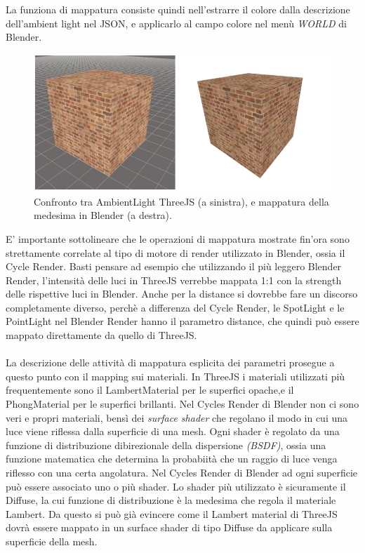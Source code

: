La funziona di mappatura consiste quindi nell’estrarre il colore dalla descrizione dell’ambient light nel JSON, e applicarlo al campo colore nel menù \emph{WORLD} di Blender.
\\
\begin{figure}[htb]
 \centering
 \includegraphics[width=1\linewidth]{images/chapter_baking_service/ba_se_confronto_cubi.png}\hfill
 \caption[Mappatura AmbientLight]{Confronto tra AmbientLight ThreeJS (a sinistra), e mappatura della medesima in Blender (a destra).}
 \label{fig:ba_se_confronto_cubi}
\end{figure}
E’ importante sottolineare che le operazioni di mappatura mostrate fin’ora sono strettamente correlate al tipo di motore di render utilizzato in Blender, ossia il Cycle Render. Basti pensare ad esempio che utilizzando il più leggero Blender Render, l’intensità delle luci in ThreeJS verrebbe mappata 1:1 con la strength delle rispettive luci in Blender. Anche per la distance si dovrebbe fare un discorso completamente diverso, perchè a differenza del Cycle Render, le SpotLight e le PointLight nel Blender Render hanno il parametro distance, che quindi può essere mappato direttamente da quello di ThreeJS.
\\
\\
La descrizione delle attività di mappatura esplicita dei parametri prosegue a questo punto con il mapping sui materiali.
In ThreeJS i materiali utilizzati più frequentemente sono il LambertMaterial per le superfici opache,e il PhongMaterial per le superfici brillanti.
Nel Cycles Render di Blender non ci sono veri e propri materiali, bensì dei \emph{surface shader} che regolano il modo in cui una luce viene riflessa dalla superficie di una mesh. Ogni shader è regolato da una funzione di distribuzione dibirezionale della dispersione \emph{(BSDF)}, ossia una funzione matematica che determina la probabiità che un raggio di luce venga riflesso con una certa angolatura. Nel Cycles Render di Blender ad ogni superficie può essere associato uno o più shader. Lo shader più utilizzato è sicuramente il Diffuse, la cui funzione di distribuzione è la medesima che regola il materiale Lambert. Da questo si può già evincere come il Lambert material di ThreeJS dovrà essere mappato in un surface shader di tipo Diffuse da applicare sulla superficie della mesh. 
